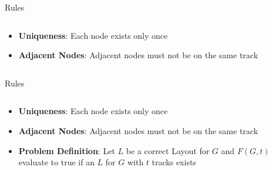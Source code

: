 \documentclass[hyperref={pdfpagelabels=false},aspectratio=169]{beamer}
\theoremstyle{definition}
\begin{document}
\begin{frame}{Rules}
\begin{columns}
    \begin{column}{0.5\textwidth}
        \begin{itemize}
            \item \textbf{Uniqueness}: Each node exists only once
            \item \textbf{Adjacent Nodes}: Adjacent nodes must not be on the same track
        \end{itemize}
    \end{column}
    \begin{column}{0.5\textwidth}
    \end{column}
\end{columns}
\end{frame}

\begin{frame}{Rules}
\begin{columns}
    \begin{column}{0.5\textwidth}
        \begin{itemize}
            \item \textbf{Uniqueness}: Each node exists only once
            \item \textbf{Adjacent Nodes}: Adjacent nodes must not be on the same track
            \item \textbf{Problem Definition}: Let $L$ be a correct Layout for $G$ and $F(G, t)$ evaluate to true if an $L$ for $G$ with $t$ tracks exists
        \end{itemize}
    \end{column}
    \begin{column}{0.5\textwidth}
    \end{column}
\end{columns}
\end{frame}
\end{document}
